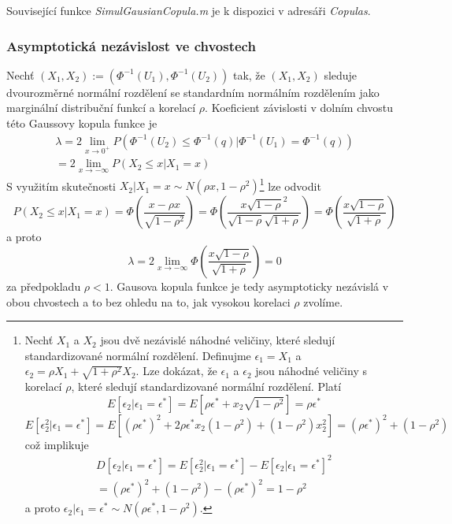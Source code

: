 Související funkce \textit{SimulGausianCopula.m} je k dispozici v adresáři \textit{Copulas}.

\subsubsection{Asymptotická nezávislost ve chvostech}

Nechť $(X_1, X_2) := (\Phi^{-1}(U_1), \Phi^{-1}(U_2))$ tak, že $(X_1, X_2)$ sleduje dvourozměrné normální rozdělení se standardním normálním rozdělením jako marginální distribuční funkcí a korelací $\rho$. Koeficient závislosti v dolním chvostu této Gaussovy kopula funkce je
\begin{multline*}
\lambda = 2 \lim_{x \rightarrow 0^+} P(\Phi^{-1}(U_2) \le \Phi^{-1}(q) | \Phi^{-1}(U_1) = \Phi^{-1}(q))\\
= 2 \lim_{x \rightarrow -\infty} P(X_2 \le x | X_1 = x)
\end{multline*}
S využitím skutečnosti $X_2 | X_1 = x \sim N(\rho x, 1 - \rho^2)$\footnote{Nechť $X_1$ a $X_2$ jsou dvě nezávislé náhodné veličiny, které sledují standardizované normální rozdělení. Definujme $\epsilon_1 = X_1$ a $\epsilon_2 = \rho X_1 + \sqrt{1 + \rho^2}X_2$. Lze dokázat, že $\epsilon_1$ a $\epsilon_2$ jsou náhodné veličiny s korelací $\rho$, které sledují standardizované normální rozdělení. Platí
\begin{equation*}
E[\epsilon_2 | \epsilon_1 = \epsilon^*] = E[\rho \epsilon^* + x_2 \sqrt{1 - \rho^2}] = \rho \epsilon^*
\end{equation*}
\begin{equation*}
E[\epsilon_2^2 | \epsilon_1 = \epsilon^*] = E[(\rho \epsilon^*)^2 + 2 \rho \epsilon^* x_2(1 - \rho^2) + (1 - \rho^2)x_2^2] = (\rho \epsilon^*)^2 + (1 - \rho^2)
\end{equation*}
což implikuje
\begin{multline*}
D[\epsilon_2 | \epsilon_1 = \epsilon^*] = E[\epsilon_2^2 | \epsilon_1 = \epsilon^*] - E[\epsilon_2 | \epsilon_1 = \epsilon^*]^2\\
= (\rho \epsilon^*)^2 + (1 - \rho^2) - (\rho \epsilon^*)^2 = 1 - \rho^2
\end{multline*}
a proto $\epsilon_2 | \epsilon_1 = \epsilon^* \sim N(\rho \epsilon^*, 1 - \rho^2)$.} lze odvodit
\begin{equation*}
P(X_2 \le x | X_1 = x) = \Phi\left(\frac{x - \rho x}{\sqrt{1 - \rho^2}} \right) = \Phi \left(\frac{x \sqrt{1 - \rho}^2}{\sqrt{1 - \rho}\sqrt{1 + \rho}}\right) = \Phi \left(\frac{x \sqrt{1 - \rho}}{\sqrt{1 + \rho}} \right)
\end{equation*}
a proto
\begin{equation*}
\lambda = 2 \lim_{x \rightarrow -\infty} \Phi\left(\frac{x \sqrt{1 - \rho}}{\sqrt{1 + \rho}}\right) = 0
\end{equation*}
za předpokladu $\rho < 1$. Gausova kopula funkce je tedy asymptoticky nezávislá v obou chvostech a to bez ohledu na to, jak vysokou korelaci $\rho$ zvolíme.

